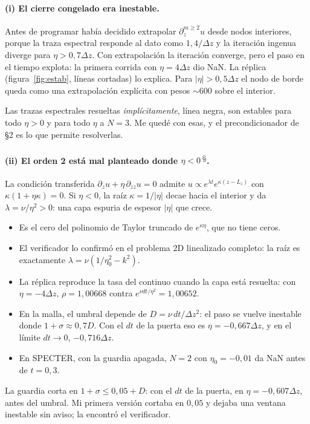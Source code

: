 \documentclass[11pt,a4paper]{article}
\newcommand{\propio}{\textsuperscript{\textcolor{gray}{\,\S}}}
\begin{document}
\paragraph{(i) El cierre congelado era inestable.} Antes de programar había decidido
extrapolar $\partial_z^{m\ge2}u$ desde nodos interiores, porque la traza espectral responde al
dato como $1{,}4/\Delta z$ y la iteración ingenua diverge para $\eta>0{,}7\Delta z$. Con
extrapolación la iteración converge, pero el paso en el tiempo explota: la primera corrida con
$\eta=4\Delta z$ dio NaN. La réplica (figura~\ref{fig:estab}, líneas cortadas) lo explica. Para
$|\eta|>0{,}5\Delta z$ el nodo de borde queda como una extrapolación explícita con pesos $\sim600$
sobre el interior.

Las trazas espectrales resueltas \emph{implícitamente}, línea negra, son estables para todo
$\eta>0$ y para todo $\eta$ a $N=3$. Me quedé con esas, y el precondicionador de §2 es lo que
permite resolverlas.

\paragraph{(ii) El orden 2 está mal planteado donde $\eta<0$\propio.} La condición transferida
$\partial_zu+\eta\,\partial_{zz}u=0$ admite $u\propto e^{\lambda t}e^{\kappa(z-L_z)}$ con
$\kappa(1+\eta\kappa)=0$. Si $\eta<0$, la raíz $\kappa=1/|\eta|$ decae hacia el interior y da
$\lambda=\nu/\eta^2>0$: una capa espuria de espesor $|\eta|$ que crece.
\begin{itemize}
\item Es el cero del polinomio de Taylor truncado de $e^{\kappa\eta}$, que no tiene ceros.
\item El verificador lo confirmó en el problema 2D linealizado completo: la raíz es exactamente
  $\lambda=\nu(1/\eta_0^2-k^2)$.
\item La réplica reproduce la tasa del continuo cuando la capa está resuelta: con
  $\eta=-4\Delta z$, $\rho=1{,}00668$ contra $e^{\nu dt/\eta^2}=1{,}00652$.
\item En la malla, el umbral depende de $D=\nu\,dt/\Delta z^2$: el paso se vuelve inestable
  donde $1+\sigma\approx0{,}7D$. Con el $dt$ de la puerta eso es $\eta=-0{,}667\Delta z$, y en
  el límite $dt\to0$, $-0{,}716\Delta z$.
\item En SPECTER, con la guardia apagada, $N=2$ con $\eta_0=-0{,}01$ da NaN antes de $t=0{,}3$.
\end{itemize}
La guardia corta en $1+\sigma\le0{,}05+D$: con el $dt$ de la puerta, en $\eta=-0{,}607\Delta z$,
antes del umbral. Mi primera versión cortaba en $0{,}05$ y dejaba una ventana inestable sin
aviso; la encontró el verificador.
\end{document}
